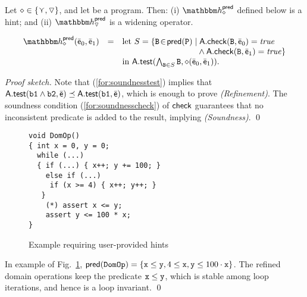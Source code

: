 \documentclass[sttt]{svjour}
\begin{document}
\begin{lemma}


Let $\diamond \in \{ \curlyvee, \triangledown\}$, and let  be a program. 
Then: (i) $\hint{\diamond}^{\mathsf{pred}}$ defined below is a hint;
and (ii) $\hint{\widening}^{\mathsf{pred}}$ is a widening operator.


\begin{small}
\[
\begin{array}{rcl}
\hint{\diamond}^{\mathsf{pred}}(\ael{e}_0, \ael{e}_1) &=&
\mathrm{let}\ S = \{ \code{B} \!\in\! \mathsf{pred}(\code{P}) \mid
\dom{A}.\checkif(\code{B}, \ael{e}_0) = \mathit{true} \\
& & \phantom{\mathrm{let}\ S = \{ \code{B} \!\in\! \mathsf{pred}(\code{P}) \mid}\wedge \dom{A}.\checkif(\code{B}, \ael{e}_1) = \mathit{true}   \} \\
& & \mathrm{in}\ \dom{A}.\guard(\bigwedge_{\code{B} \in S} \code{B}, \diamond(\ael{e}_0, \ael{e}_1)).
\end{array}
\]
\end{small}
\end{lemma}
\textit{Proof sketch.}
Note that (\ref{for:soundnesstest}) implies that ${\mathsf{A}}.\mathsf{\mathsf{test}}(\mathtt{b1} \wedge \mathtt{b2}, \bar{\mathsf{\mathsf{e}}}) \preceq  {\mathsf{A}}.\mathsf{\mathsf{test}}(\mathtt{b1}, \bar{\mathsf{\mathsf{e}}})$, which is enough to prove \textit{(Refinement)}.
The soundness condition (\ref{for:soundnesscheck}) of $\mathsf{check}$ guarantees that no inconsistent predicate is added to the result, implying \textit{(Soundness)}.
\qed

\begin{figure}
\begin{verbatim}
void DomOp() 
{ int x = 0, y = 0;
  while (...) 
  { if (...) { x++; y += 100; }
    else if (...)  
     if (x >= 4) { x++; y++; } 
   }
    (*) assert x <= y;
    assert y <= 100 * x; 
}
\end{verbatim}
\caption{Example requiring user-provided hints}
\label{fig:userhints}
\end{figure}

\begin{example} 
In example of Fig.~\ref{fig:userhints}, $\mathsf{pred}(\mathtt{DomOp}) = \{ \mathtt{x} \leq \mathtt{y}, 4 \leq \mathtt{x}, \mathtt{y} \leq 100 \cdot \mathtt{x} \}$.
The refined domain operations keep the predicate $\mathtt{x} \leq \mathtt{y}$, which is stable among loop iterations, and hence is  a loop invariant. \qed
\end{example}

\end{document}
